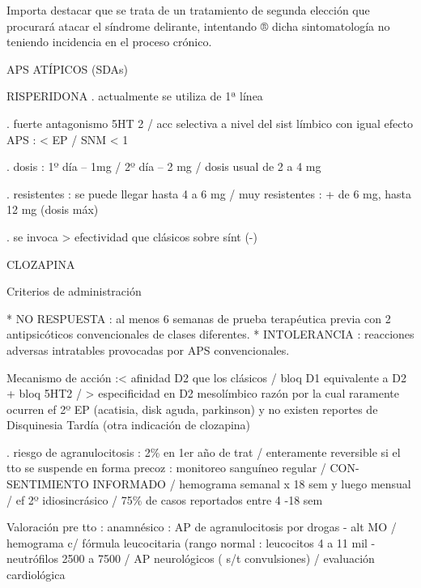 \documentclass[encares.tex]{subfiles}
\begin{document}
Importa destacar que se trata de un tratamiento de segunda elección que procurará atacar el síndrome delirante, intentando ® dicha sintomatología no teniendo incidencia en el proceso crónico.

APS ATÍPICOS (SDAs)

RISPERIDONA . actualmente se utiliza de 1ª línea

. fuerte antagonismo 5HT 2 / acc selectiva a nivel del sist límbico con igual efecto APS : < EP / SNM < 1%

. dosis : 1º día – 1mg / 2º día – 2 mg / dosis usual de 2 a 4 mg

. resistentes : se puede llegar hasta 4 a 6 mg / muy resistentes : + de 6 mg, hasta 12 mg (dosis máx)

. se invoca > efectividad que clásicos sobre sínt (-)

CLOZAPINA

Criterios de administración

* NO RESPUESTA : al menos 6 semanas de prueba terapéutica previa con 2 antipsicóticos convencionales de clases diferentes.
* INTOLERANCIA : reacciones adversas intratables provocadas por APS convencionales.

Mecanismo de acción :< afinidad D2 que los clásicos / bloq D1 equivalente a D2 + bloq 5HT2 / > especificidad en D2 mesolímbico razón por la cual raramente ocurren ef 2º EP (acatisia, disk aguda, parkinson) y no existen reportes de Disquinesia Tardía (otra indicación de clozapina)

. riesgo de agranulocitosis : 2\% en 1er año de trat / enteramente reversible si el tto se suspende en forma precoz : monitoreo sanguíneo regular / CON-SENTIMIENTO INFORMADO / hemograma semanal x 18 sem y luego mensual / ef 2º idiosincrásico / 75\% de casos reportados entre 4 -18 sem

Valoración pre tto : anamnésico : AP de agranulocitosis por drogas - alt MO / hemograma c/ fórmula leucocitaria (rango normal : leucocitos 4 a 11 mil - neutrófilos 2500 a 7500 / AP neurológicos ( s/t convulsiones) / evaluación cardiológica
\end{document}
